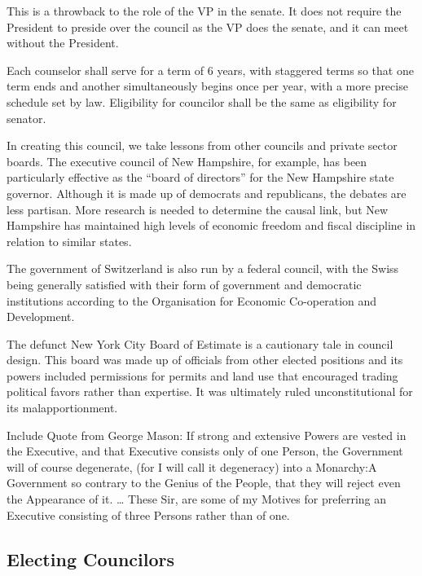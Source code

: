 \documentclass{article}
\begin{document}
This is a throwback to the role of the VP in the senate. It does not require the President to preside over the council as the VP does the senate, and it can meet without the President.

\begin{quoting}
Each counselor shall serve for a term of 6 years, with staggered terms so that one term ends and another simultaneously begins once per year, with a more precise schedule set by law. Eligibility for councilor shall be the same as eligibility for senator.
\end{quoting}

In creating this council, we take lessons from other councils and private sector boards. The executive council of New Hampshire, for example, has been particularly effective as the “board of directors” for the New Hampshire state governor\cite{Hahn-Burkett}. Although it is made up of democrats and republicans, the debates are less partisan\cite{Timmins}. More research is needed to determine the causal link, but New Hampshire has maintained high levels of economic freedom and fiscal discipline in relation to similar states\cite{Ruger}.

The government of Switzerland is also run by a federal council, with the Swiss being generally satisfied with their form of government and democratic institutions according to the Organisation for Economic Co-operation and Development\cite{Kaufman}.

The defunct New York City Board of Estimate is a cautionary tale in council design. This board was made up of officials from other elected positions and its powers included permissions for permits and land use that encouraged trading political favors rather than expertise\cite{Purnick}. It was ultimately ruled unconstitutional for its malapportionment\cite{Board_of_Estimate}.

Include Quote from George Mason: If strong and extensive Powers are vested in the Executive, and that Executive consists only of one Person, the Government will of course degenerate, (for I will call it degeneracy) into a Monarchy:A Government so contrary to the Genius of the People, that they will reject even the Appearance of it.
…
 These Sir, are some of my Motives for preferring an Executive consisting of three Persons rather than of one.


\subsection{Electing Councilors}
\end{document}

